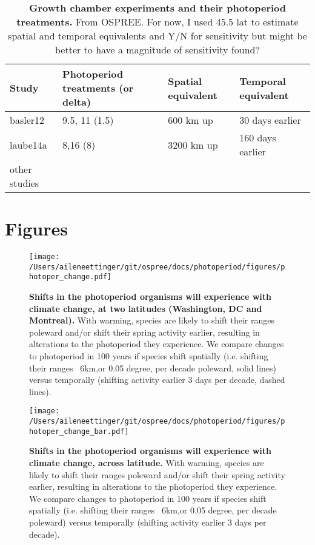 \documentclass{article}
\begin{document}
\begin{table}[p]
  \caption{\textbf{Growth chamber experiments and their photoperiod treatments.} From OSPREE. For now, I used 45.5 lat to estimate spatial and temporal equivalents and Y/N for sensitivity but might be better to have a magnitude of sensitivity found?}
\begin{footnotesize} 
   \begin{tabular}{| p{1cm} | p{3.8cm} | p{2.9 cm} | p{3.2 cm} |}
    \hline
  \bf{Study} & \bf{Photoperiod treatments (or delta)} & \bf{Spatial equivalent} & \bf{Temporal equivalent}\\ \hline
    basler12 & 9.5, 11 (1.5) &  600 km up & 30 days earlier \\ \hline
    laube14a & 8,16 (8) &  3200 km up & 160 days earlier \\ \hline
    other studies &  &   & \\ \hline

     \end{tabular}    
\end{footnotesize} 
    \end{table}
\clearpage
\section* {Figures}
\begin{figure}[p]
\centering
\texttt{[image: /Users/aileneettinger/git/ospree/docs/photoperiod/figures/photoper\_change.pdf]} 
\caption{\textbf{Shifts in the photoperiod organisms will experience with climate change, at two latitudes (Washington, DC and Montreal).}  With warming, species are likely to shift their ranges poleward and/or shift their spring activity earlier, resulting in alterations to the photoperiod they experience. We compare changes to photoperiod in 100 years if species shift spatially (i.e. shifting their ranges ~6km,or 0.05 degree, per decade poleward, solid lines) versus temporally (shifting activity earlier 3 days per decade, dashed lines).}
 \label{fig:photo}
 \end{figure}
\begin{figure}[p]
\centering
\texttt{[image: /Users/aileneettinger/git/ospree/docs/photoperiod/figures/photoper\_change\_bar.pdf]} 
\caption{\textbf{Shifts in the photoperiod organisms will experience with climate change, across latitude.}  With warming, species are likely to shift their ranges poleward and/or shift their spring activity earlier, resulting in alterations to the photoperiod they experience. We compare changes to photoperiod in 100 years if species shift spatially (i.e. shifting their ranges ~6km,or 0.05 degree, per decade poleward) versus temporally (shifting activity earlier 3 days per decade).}
 \label{fig:photo_bar}%
 \end{figure}
\clearpage



\end{document}
